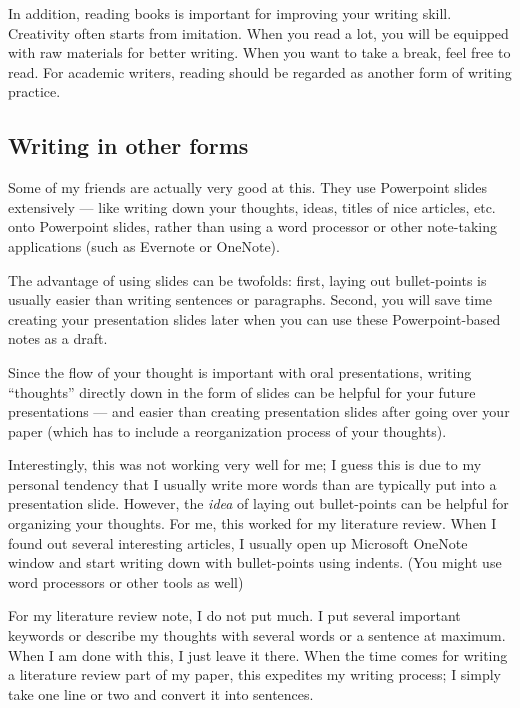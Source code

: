 \documentclass[11pt]{article}
\begin{document}
In addition, reading books is important for improving your writing skill.
Creativity often starts from imitation. When you read a lot, you will be
equipped with raw materials for better writing. When you want to take a
break, feel free to read. For academic writers, reading should be regarded as
another form of writing practice.

\subsection{Writing in other forms}

Some of my friends are actually very good at this. They use Powerpoint slides
extensively --- like writing down your thoughts, ideas, titles of nice
articles, etc. onto Powerpoint slides, rather than using a word processor or
other note-taking applications (such as Evernote or OneNote).

The advantage of using slides can be twofolds: first, laying out bullet-points
is usually easier than writing sentences or paragraphs. Second, you will save
time creating your presentation slides later when you can use these
Powerpoint-based notes as a draft.

Since the flow of your thought is important with oral presentations, writing
``thoughts'' directly down in the form of slides can be helpful for your
future presentations --- and easier than creating presentation slides
after going over your paper (which has to include a reorganization process of
your thoughts).

Interestingly, this was not working very well for me; I guess this is due to
my personal tendency that I usually write more words than are typically put
into a presentation slide. However, the \emph{idea} of laying out
bullet-points can be helpful for organizing your thoughts. For me, this worked
for my literature review. When I found out several interesting articles, I
usually open up Microsoft OneNote window and start writing down with
bullet-points using indents. (You might use word processors or other tools as
well)

For my literature review note, I do not put much. I put several important
keywords or describe my thoughts with several words or a sentence at maximum.
When I am done with this, I just leave it there.  When the time comes for 
writing a literature review part of my paper, this expedites my writing
process; I simply take one line or two and convert it into sentences.
\end{document}
